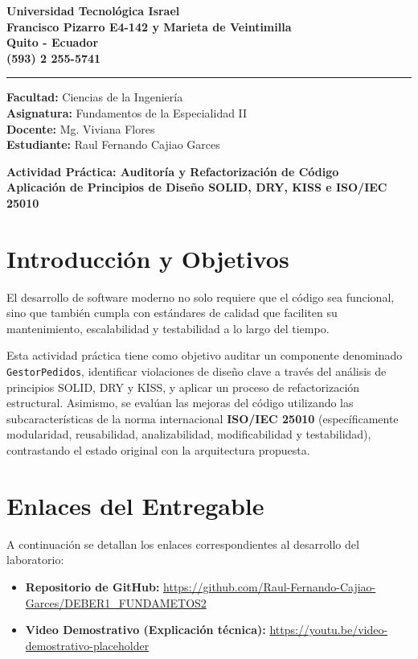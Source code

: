 \documentclass[12pt, a4paper]{article}
\begin{document}
\begin{center}
    \textbf{Universidad Tecnológica Israel} \\
    \textbf{Francisco Pizarro E4-142 y Marieta de Veintimilla} \\
    \textbf{Quito - Ecuador} \\
    \textbf{(593) 2 255-5741}
\end{center}
\noindent\rule{\textwidth}{1pt}

\vspace{0.5cm}
\noindent
\textbf{Facultad:} Ciencias de la Ingeniería \\
\textbf{Asignatura:} Fundamentos de la Especialidad II \\
\textbf{Docente:} Mg. Viviana Flores \\
\textbf{Estudiante:} Raul Fernando Cajiao Garces \\

\vspace{1cm}
\begin{center}
    \Large \textbf{Actividad Práctica: Auditoría y Refactorización de Código} \\
    \large \textbf{Aplicación de Principios de Diseño SOLID, DRY, KISS e ISO/IEC 25010}
\end{center}

\vspace{0.5cm}

\section{Introducción y Objetivos}
El desarrollo de software moderno no solo requiere que el código sea funcional, sino que también cumpla con estándares de calidad que faciliten su mantenimiento, escalabilidad y testabilidad a lo largo del tiempo. 

Esta actividad práctica tiene como objetivo auditar un componente denominado \texttt{GestorPedidos}, identificar violaciones de diseño clave a través del análisis de principios SOLID, DRY y KISS, y aplicar un proceso de refactorización estructural. Asimismo, se evalúan las mejoras del código utilizando las subcaracterísticas de la norma internacional \textbf{ISO/IEC 25010} (específicamente modularidad, reusabilidad, analizabilidad, modificabilidad y testabilidad), contrastando el estado original con la arquitectura propuesta.

\section{Enlaces del Entregable}
A continuación se detallan los enlaces correspondientes al desarrollo del laboratorio:
\begin{itemize}
    \item \textbf{Repositorio de GitHub:} \href{https://github.com/Raul-Fernando-Cajiao-Garces/DEBER1_FUNDAMETOS2}{https://github.com/Raul-Fernando-Cajiao-Garces/DEBER1\_FUNDAMETOS2}
    \item \textbf{Video Demostrativo (Explicación técnica):} \href{https://youtu.be/video-demostrativo-placeholder}{https://youtu.be/video-demostrativo-placeholder}
\end{itemize}
\end{document}

